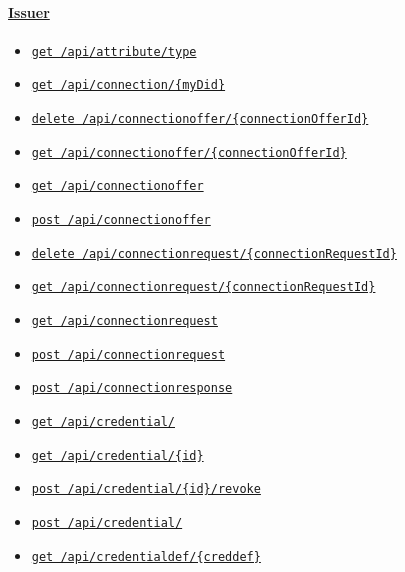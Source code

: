 \hypertarget{issuer}{%
\paragraph{\texorpdfstring{\protect\hyperlink{Issuer}{Issuer}}{Issuer}}\label{issuer}}

\begin{itemize}
\tightlist
\item
  \protect\hyperlink{apiAttributeTypeGet}{\texttt{get\ /api/attribute/type}}
\item
  \protect\hyperlink{apiConnectionMyDidGet}{\texttt{get\ /api/connection/\{myDid\}}}
\item
  \protect\hyperlink{apiConnectionofferConnectionOfferIdDelete}{\texttt{delete\ /api/connectionoffer/\{connectionOfferId\}}}
\item
  \protect\hyperlink{apiConnectionofferConnectionOfferIdGet}{\texttt{get\ /api/connectionoffer/\{connectionOfferId\}}}
\item
  \protect\hyperlink{apiConnectionofferGet}{\texttt{get\ /api/connectionoffer}}
\item
  \protect\hyperlink{apiConnectionofferPost}{\texttt{post\ /api/connectionoffer}}
\item
  \protect\hyperlink{apiConnectionrequestConnectionRequestIdDelete}{\texttt{delete\ /api/connectionrequest/\{connectionRequestId\}}}
\item
  \protect\hyperlink{apiConnectionrequestConnectionRequestIdGet}{\texttt{get\ /api/connectionrequest/\{connectionRequestId\}}}
\item
  \protect\hyperlink{apiConnectionrequestGet}{\texttt{get\ /api/connectionrequest}}
\item
  \protect\hyperlink{apiConnectionrequestPost}{\texttt{post\ /api/connectionrequest}}
\item
  \protect\hyperlink{apiConnectionresponsePost}{\texttt{post\ /api/connectionresponse}}
\item
  \protect\hyperlink{apiCredentialGet}{\texttt{get\ /api/credential/}}
\item
  \protect\hyperlink{apiCredentialIdGet}{\texttt{get\ /api/credential/\{id\}}}
\item
  \protect\hyperlink{apiCredentialIdRevokePost}{\texttt{post\ /api/credential/\{id\}/revoke}}
\item
  \protect\hyperlink{apiCredentialPost}{\texttt{post\ /api/credential/}}
\item
  \protect\hyperlink{apiCredentialdefCreddefGet}{\texttt{get\ /api/credentialdef/\{creddef\}}}

\end{itemize}
